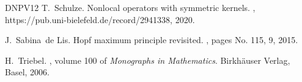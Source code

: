 \documentclass[11pt,reqno]{amsart}
\theoremstyle{plain}
\theoremstyle{definition}
\numberwithin{equation}{section}
\newcommand{\1}{\mathbbm{1}}
\begin{document}
\begin{thebibliography}{DNPV12}
T.~Schulze.
\newblock Nonlocal operators with symmetric kernels.
, https://pub.uni-bielefeld.de/record/2941338, 2020.

J.~Sabina~de Lis.
\newblock Hopf maximum principle revisited.
, pages No. 115, 9, 2015.

H.~Triebel.
, volume 100 of {\em Monographs
  in Mathematics}.
\newblock Birkh\"auser Verlag, Basel, 2006.

\end{thebibliography}


% 
% 
\end{document}
